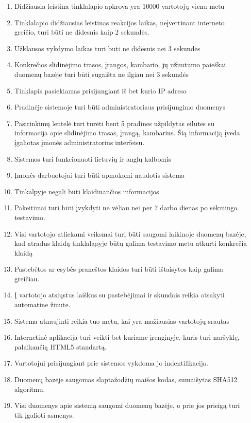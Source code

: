 \documentclass[oneside]{VUMIFPSkursinis}
\begin{document}
\begin{enumerate}
	\item Didžiausia leistina tinklalapio apkrova yra 10000 vartotojų vienu metu
	\item Tinklalapio didžiausias leistinas reakcijos laikas, neįvertinant interneto greičio, turi būti ne didesnis kaip 2 sekundės.
	\item Užklausos vykdymo laikas turi būti ne didesnis nei 3 sekundės
	\item Konkrečios slidinėjimo trasos, įrangos, kambario, jų užimtumo paieškai duomenų bazėje turi būti sugaišta ne ilgiau nei 3 sekundės
	\item Tinklapis pasiekiamas prisijungiant iš bet kurio IP adreso
	\item Pradinėje sistemoje turi būti administratoriaus prisijungimo duomenys
	\item Pasirinkimų lentelė turi turėti bent 5 pradines užpildytas eilutes su informacija apie slidinėjimo trasas, įrangą, kambarius. Šią informaciją įveda įgaliotas įmonės administratorius interfeisu.
	\item Sistemos turi funkcionuoti lietuvių ir anglų kalbomis
	\item Įmonės darbuotojai turi būti apmokomi naudotis sistema
	\item Tinkalpyje negali būti klaidinančios informacijos
	\item Pakeitimai turi būti įvykdyti ne vėliau nei per 7 darbo dienas po sėkmingo testavimo.
	\item Visi vartotojo atliekami veiksmai turi būti saugomi laikinoje duomenų bazėje, kad atradus klaidą tinklalapyje būtų galima testavimo metu atkurti konkrečia klaidą
	\item Pastebėtos ar esybės praneštos klaidos turi būti ištaisytos kaip galima greičiau.
	\item Į vartotojo atsiųstus laiškus su pastebėjimai ir skundais reikia atsakyti automatine žinute.
	\item Sistema atnaujinti reikia tuo metu, kai yra mažiausias vartotojų srautas
	\item Internetinė aplikacija turi veikti bet kuriame įrenginyje, kuris turi naršyklę, palaikančią HTML5 standartą.
	\item Vartotojui prisijungiant prie sistemos vykdoma jo indentifikacija.
	\item Duomenų bazėje saugomas slaptažodžių maišos kodas, sumaišytas SHA512 algoritmu.
	\item Visi duomenys apie sistemą saugomi duomenų bazėje, o prie jos prieigą turi tik įgalioti asmenys.

\end{enumerate}
\end{document}

